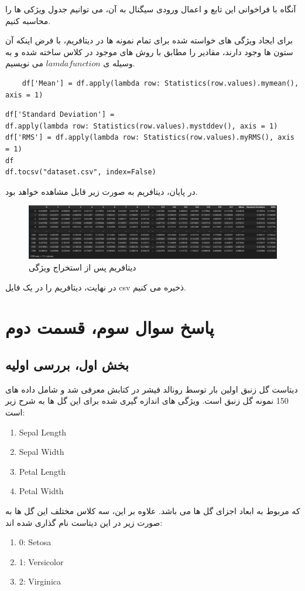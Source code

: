 آنگاه با فراخوانی این تابع و اعمال ورودی سیگنال به آن، می توانیم جدول ویژکی ها را محاسبه کنیم.

برای ایجاد ویژگی های خواسته شده برای تمام نمونه ها در دیتافریم، با فرض اینکه آن ستون ها وجود دارند، مقادیر را مطابق با روش های موجود در کلاس ساخته شده و به وسیله ی $lamda function$ می نویسیم.
\begin{verbatim}
	df['Mean'] = df.apply(lambda row: Statistics(row.values).mymean(), axis = 1)
\end{verbatim}
	
\begin{verbatim}
df['Standard Deviation'] =
df.apply(lambda row: Statistics(row.values).mystddev(), axis = 1)
df['RMS'] = df.apply(lambda row: Statistics(row.values).myRMS(), axis = 1)
df
df.tocsv("dataset.csv", index=False)
\end{verbatim}
در پایان، دیتافریم به صورت زیر قابل مشاهده خواهد بود.
\begin{figure}[H]
	\centering
	\includegraphics[width=1\linewidth]{../img/6}
	\caption{دیتافریم پس از استخراج ویژگی}
	\label{fig:6}
\end{figure}
در نهایت، دیتافریم را در یک فایل csv ذخیره می کنیم.
\section{پاسخ سوال سوم، قسمت دوم}
\subsection{بخش اول، بررسی اولیه}
دیتاست گل زنبق اولین بار توسط رونالد فیشر در کتابش معرفی شد و شامل داده های 150 نمونه گل زنبق است. ویژگی های اندازه گیری شده برای این گل ها به شرح زیر است:
\begin{enumerate}
	\item Sepal Length
	\item Sepal Width
	\item Petal Length
	\item Petal Width
\end{enumerate}
که مربوط به ابعاد اجزای گل ها می باشد. علاوه بر این، سه کلاس مختلف این گل ها به صورت زیر در این دیتاست نام گذاری شده اند:
\begin{enumerate}
	\item 0: Setosa
	\item 1: Versicolor
	\item 2: Virginica
\end{enumerate}

